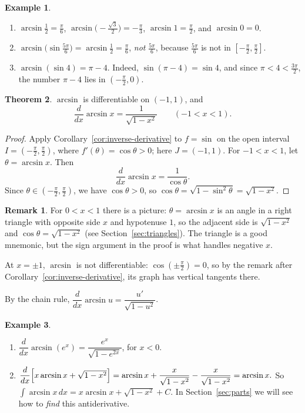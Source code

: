 \documentclass[12pt,letterpaper]{article}
\theoremstyle{definition}
\newtheorem{theorem}{Theorem}[section]
\newtheorem{example}[theorem]{Example}
\newtheorem*{remark}{Remark}
\begin{document}
\begin{example}
  \begin{enumerate}[label=(\alph*)]
    \item $\arcsin\frac12=\frac\pi6$, $\arcsin\bigl(-\frac{\sqrt3}{2}\bigr)
      =-\frac\pi3$, $\arcsin1=\frac\pi2$, and $\arcsin0=0$.
    \item $\arcsin\bigl(\sin\frac{5\pi}{6}\bigr)=\arcsin\frac12=\frac\pi6$,
      \emph{not} $\frac{5\pi}{6}$, because $\frac{5\pi}{6}$ is not in
      $[-\frac\pi2,\frac\pi2]$.
    \item $\arcsin(\sin4)=\pi-4$. Indeed, $\sin(\pi-4)=\sin4$, and since
      $\pi<4<\frac{3\pi}{2}$, the number $\pi-4$ lies in
      $(-\frac\pi2,0)$.
  \end{enumerate}
\end{example}

\begin{theorem}\label{thm:arcsin-derivative}
  $\arcsin$ is differentiable on $(-1,1)$, and
  \[
    \frac{d}{dx}\arcsin x=\frac{1}{\sqrt{1-x^2}}
    \qquad(-1<x<1).
  \]
\end{theorem}

\begin{proof}
  Apply Corollary~\ref{cor:inverse-derivative} to $f=\sin$ on the open
  interval $I=(-\frac\pi2,\frac\pi2)$, where $f'(\theta)=\cos\theta>0$; here
  $J=(-1,1)$. For $-1<x<1$, let $\theta=\arcsin x$. Then
  \[
    \frac{d}{dx}\arcsin x=\frac{1}{\cos\theta}.
  \]
  Since $\theta\in(-\frac\pi2,\frac\pi2)$, we have $\cos\theta>0$, so
  $\cos\theta=\sqrt{1-\sin^2\theta}=\sqrt{1-x^2}$.
\end{proof}

\begin{remark}
  For $0<x<1$ there is a picture: $\theta=\arcsin x$ is an angle in a right
  triangle with opposite side $x$ and hypotenuse $1$, so the adjacent side is
  $\sqrt{1-x^2}$ and $\cos\theta=\sqrt{1-x^2}$ (see
  Section~\ref{sec:triangles}). The triangle is a good mnemonic, but the sign
  argument in the proof is what handles negative $x$.

  At $x=\pm1$, $\arcsin$ is not differentiable: $\cos(\pm\frac\pi2)=0$, so by
  the remark after Corollary~\ref{cor:inverse-derivative}, its graph has
  vertical tangents there.
\end{remark}

By the chain rule, $\dfrac{d}{dx}\arcsin u=\dfrac{u'}{\sqrt{1-u^2}}$.

\begin{example}
  \begin{enumerate}[label=(\alph*)]
    \item $\dfrac{d}{dx}\arcsin(e^x)=\dfrac{e^x}{\sqrt{1-e^{2x}}}$, for
      $x<0$.
    \item $\dfrac{d}{dx}\Bigl[x\arcsin x+\sqrt{1-x^2}\Bigr]
      =\arcsin x+\dfrac{x}{\sqrt{1-x^2}}-\dfrac{x}{\sqrt{1-x^2}}
      =\arcsin x.$
      So $\int\arcsin x\,dx=x\arcsin x+\sqrt{1-x^2}+C$. In
      Section~\ref{sec:parts} we will see how to \emph{find} this
      antiderivative.
  \end{enumerate}
\end{example}
\end{document}
